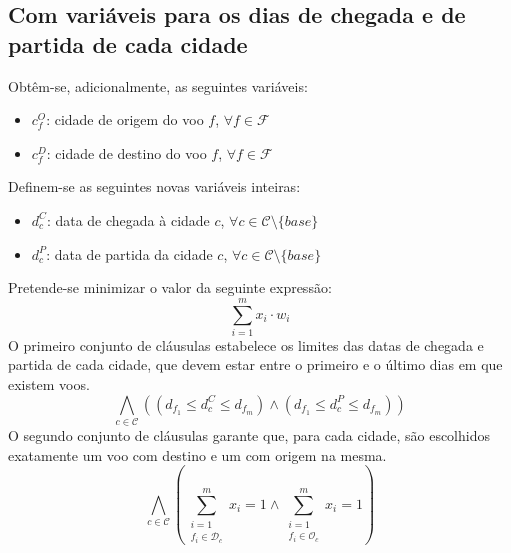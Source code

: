 \documentclass[12pt,a4paper]{article}
\begin{document}
    \subsection{Com variáveis para os dias de chegada e de partida de cada cidade}
        \label{2}
        Obtêm-se, adicionalmente, as seguintes variáveis:
        \begin{itemize}
            \item $c_f^O$: cidade de origem do voo $f$, $\forall f \in \mathcal{F}$
            \item $c_f^D$: cidade de destino do voo $f$, $\forall f \in \mathcal{F}$
        \end{itemize}
        Definem-se as seguintes novas variáveis inteiras:
        \begin{itemize}
            \item $d_c^C$: data de chegada à cidade $c$, $\forall c \in \mathcal{C} \setminus \{base\}$
            \item $d_c^P$: data de partida da cidade $c$, $\forall c \in \mathcal{C} \setminus \{base\}$
        \end{itemize}
        Pretende-se minimizar o valor da seguinte expressão:
        \begin{equation}
            \sum_{i = 1}^m x_i \cdot w_i
            \label{minimize_1}
        \end{equation}
        O primeiro conjunto de cláusulas estabelece os limites das datas de chegada e partida de cada cidade, que devem estar entre o primeiro e o último dias em que existem voos.
        \begin{equation}
            \bigwedge_{c \in \mathcal{C}}
            \left(
            \left( d_{f_1} \leq d_c^C \leq d_{f_m} \right)
            \land
            \left( d_{f_1} \leq d_c^P \leq d_{f_m} \right)
            \right)
            \label{minimize_2}
        \end{equation}
        O segundo conjunto de cláusulas garante que, para cada cidade, são escolhidos exatamente um voo com destino e um com origem na mesma.
        \begin{equation}
            \bigwedge_{c \in \mathcal{C}}
            \left(
            \sum_{\substack{i = 1 \\
                            f_i \in \mathcal{D}_c}}
                ^{m}
                {x_i} = 1
            \land
            \sum_{\substack{i = 1 \\
                            f_i \in \mathcal{O}_c}}
                ^{m}
                {x_i} = 1
            \right)
            \label{exactly_one_per_c_2}
        \end{equation}
\end{document}
